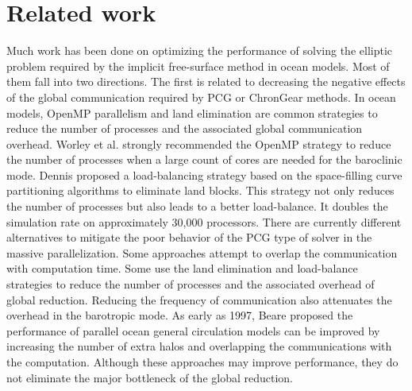 \section{Related work} \label{se:rel}

Much work has been done on optimizing the performance of solving the elliptic problem required by the implicit free-surface method in ocean models.  
Most of them fall into two directions.  
The first is related to decreasing the negative effects of the global communication required by PCG or ChronGear methods.  In ocean models, OpenMP parallelism and land elimination are common strategies to reduce the number of processes and the associated  global communication overhead. Worley et al. \cite{Worley:2011:PCE:2063384.2063457} strongly recommended the OpenMP strategy to reduce the number of processes when a large count of cores are needed for the baroclinic mode.
Dennis \cite{dennis2007inverse,dennis2008scaling} proposed a load-balancing strategy based on the space-filling curve partitioning algorithms to eliminate land blocks.  This strategy not only reduces the number of processes but also leads to a better load-balance.
It doubles the simulation rate on approximately 30,000 processors.    
There are currently different alternatives to mitigate the poor behavior of the PCG type of solver in the massive parallelization.
Some approaches attempt to overlap the communication with computation time\cite{beare1997optimisation}.
Some use the land elimination and load-balance strategies \cite{dennis2007inverse, dennis2008scaling}
to reduce the number of processes and the associated overhead of global reduction.
Reducing the frequency of communication also attenuates the overhead in the barotropic mode.
As early as 1997,  Beare \cite{beare1997optimisation} proposed the performance of parallel ocean general circulation models can be improved by increasing the number of extra halos and overlapping the communications with the computation.
Although these approaches may improve performance, they do not eliminate the major bottleneck of the global reduction.

